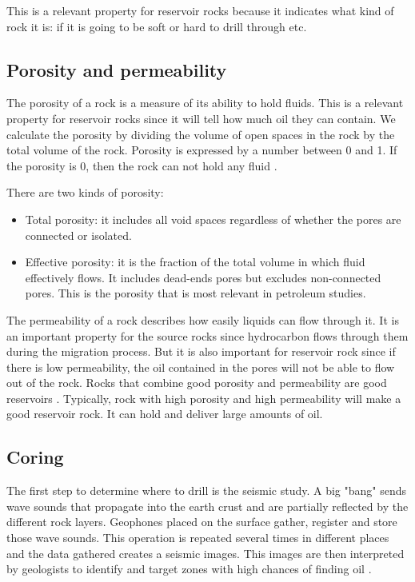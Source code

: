 This is a relevant property for reservoir rocks because it indicates what kind of rock it is: if it is going to be soft or hard to drill through etc.

\subsection{Porosity and permeability}

The porosity of a rock is a measure of its ability to hold fluids. This is a relevant property for reservoir rocks since it will tell how much oil they can contain. We calculate the porosity by dividing the volume of open spaces in the rock by the total volume of the rock. Porosity is expressed by a number between 0 and 1. If the porosity is 0, then the rock can not hold any fluid \cite{oilbegin}. 
 
There are two kinds of porosity:
\begin{itemize}
    \item Total porosity: it includes all void spaces regardless of whether the pores are connected or isolated.
    \item Effective porosity: it is the fraction of the total volume in which fluid effectively flows. It includes dead-ends pores but excludes non-connected pores. This is the porosity that is most relevant in petroleum studies. 
\end{itemize}

The permeability of a rock describes how easily liquids can flow through it. It is an important property for the source rocks since hydrocarbon flows through them during the migration process. But it is also important for reservoir rock since if there is low permeability, the oil contained in the pores will not be able to flow out of the rock. 
Rocks that  combine good porosity and permeability are good reservoirs . Typically, rock with high porosity and high permeability will make a good reservoir rock. It can hold and deliver large amounts of oil. 

\subsection{Coring}\label{sec:coring}
The first step to determine where to drill is the seismic study. A big "bang" sends wave sounds that propagate into the earth crust and are partially reflected by the different rock layers. Geophones placed on the surface gather, register and store those wave sounds. This operation is repeated several times in different places and the data gathered creates a seismic images. This images are then interpreted by geologists to identify and target zones with high chances of finding oil \cite{oilbegin}. 


